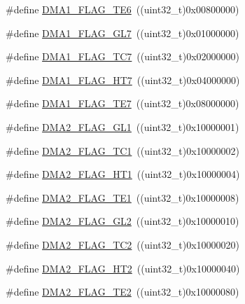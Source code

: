 \begin{DoxyCompactItemize}
\item 
\#define \mbox{\hyperlink{group___d_m_a__flags__definition_ga231e156a0e27f7b2271ea44ca90c237d}{D\+M\+A1\+\_\+\+F\+L\+A\+G\+\_\+\+T\+E6}}~((uint32\+\_\+t)0x00800000)
\item 
\#define \mbox{\hyperlink{group___d_m_a__flags__definition_ga37e5e27ca5bf6f3211d2effda2ca7646}{D\+M\+A1\+\_\+\+F\+L\+A\+G\+\_\+\+G\+L7}}~((uint32\+\_\+t)0x01000000)
\item 
\#define \mbox{\hyperlink{group___d_m_a__flags__definition_ga327907756920f193d5d57d8cca845ad6}{D\+M\+A1\+\_\+\+F\+L\+A\+G\+\_\+\+T\+C7}}~((uint32\+\_\+t)0x02000000)
\item 
\#define \mbox{\hyperlink{group___d_m_a__flags__definition_ga1a7cbf9dffa4fc5ef1cedb46ea446387}{D\+M\+A1\+\_\+\+F\+L\+A\+G\+\_\+\+H\+T7}}~((uint32\+\_\+t)0x04000000)
\item 
\#define \mbox{\hyperlink{group___d_m_a__flags__definition_ga8b967e41e2d2dcc6d638a664f8e0900c}{D\+M\+A1\+\_\+\+F\+L\+A\+G\+\_\+\+T\+E7}}~((uint32\+\_\+t)0x08000000)
\item 
\#define \mbox{\hyperlink{group___d_m_a__flags__definition_ga34b82697f14e2fa9f7abeb4c43502822}{D\+M\+A2\+\_\+\+F\+L\+A\+G\+\_\+\+G\+L1}}~((uint32\+\_\+t)0x10000001)
\item 
\#define \mbox{\hyperlink{group___d_m_a__flags__definition_ga828c97967dbdb48d267ed0f0c4e9b8a5}{D\+M\+A2\+\_\+\+F\+L\+A\+G\+\_\+\+T\+C1}}~((uint32\+\_\+t)0x10000002)
\item 
\#define \mbox{\hyperlink{group___d_m_a__flags__definition_ga2264376d92756f07122883c8f3359258}{D\+M\+A2\+\_\+\+F\+L\+A\+G\+\_\+\+H\+T1}}~((uint32\+\_\+t)0x10000004)
\item 
\#define \mbox{\hyperlink{group___d_m_a__flags__definition_ga415793b309369076a9d797ad0757a9c1}{D\+M\+A2\+\_\+\+F\+L\+A\+G\+\_\+\+T\+E1}}~((uint32\+\_\+t)0x10000008)
\item 
\#define \mbox{\hyperlink{group___d_m_a__flags__definition_gaa646f1ffc4468931a748ecff6440d40f}{D\+M\+A2\+\_\+\+F\+L\+A\+G\+\_\+\+G\+L2}}~((uint32\+\_\+t)0x10000010)
\item 
\#define \mbox{\hyperlink{group___d_m_a__flags__definition_ga7da2f61b8c67923904312796fd76def3}{D\+M\+A2\+\_\+\+F\+L\+A\+G\+\_\+\+T\+C2}}~((uint32\+\_\+t)0x10000020)
\item 
\#define \mbox{\hyperlink{group___d_m_a__flags__definition_gaa4ecfdaca0509737af68143d23d0267c}{D\+M\+A2\+\_\+\+F\+L\+A\+G\+\_\+\+H\+T2}}~((uint32\+\_\+t)0x10000040)
\item 
\#define \mbox{\hyperlink{group___d_m_a__flags__definition_ga3d396b14851e789ad549126da55b7f3f}{D\+M\+A2\+\_\+\+F\+L\+A\+G\+\_\+\+T\+E2}}~((uint32\+\_\+t)0x10000080)

\end{DoxyCompactItemize}
